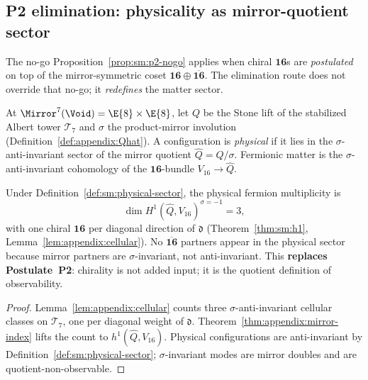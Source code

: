 \subsection{P2 elimination: physicality as mirror-quotient sector}
\label{sec:axiomatic:p2}

The no-go Proposition~\ref{prop:sm:p2-nogo} applies when chiral $\mathbf{16}$s are
\emph{postulated} on top of the mirror-symmetric coset
$\mathbf{16}\oplus\overline{\mathbf{16}}$. The elimination route does not
override that no-go; it \emph{redefines} the matter sector.

\begin{definition}
\label{def:sm:physical-sector}
At $\Mirror^7(\Void)=\E{8}\times\E{8}$, let $Q$ be the Stone lift of the
stabilized Albert tower $\mathcal{T}_7$ and $\sigma$ the product-mirror
involution (Definition~\ref{def:appendix:Qhat}). A configuration is
\emph{physical} if it lies in the $\sigma$-anti-invariant sector of the
mirror quotient $\hat Q=Q/\sigma$. Fermionic matter is the $\sigma$-anti-invariant
cohomology of the $\mathbf{16}$-bundle $V_{16}\to\hat Q$.
\end{definition}

\begin{theorem}
\label{thm:sm:chirality-derived}
Under Definition~\ref{def:sm:physical-sector}, the physical fermion multiplicity
is
\begin{equation}\label{eq:sm:chirality-derived}
  \dim H^1(\hat Q,V_{16})^{\sigma=-1}=3,
\end{equation}
with one chiral $\mathbf{16}$ per diagonal direction of $\mathfrak{d}$
(Theorem~\ref{thm:sm:h1}, Lemma~\ref{lem:appendix:cellular}). No
$\overline{\mathbf{16}}$ partners appear in the physical sector because
mirror partners are $\sigma$-invariant, not anti-invariant. This
\textbf{replaces Postulate~P2}: chirality is not added input; it is the
quotient definition of observability.
\end{theorem}

\begin{proof}
Lemma~\ref{lem:appendix:cellular} counts three $\sigma$-anti-invariant cellular
classes on $\mathcal{T}_7$, one per diagonal weight of $\mathfrak{d}$.
Theorem~\ref{thm:appendix:mirror-index} lifts the count to $h^1(\hat Q,V_{16})$.
Physical configurations are anti-invariant by
Definition~\ref{def:sm:physical-sector}; $\sigma$-invariant modes are
mirror doubles and are quotient-non-observable.
\end{proof}

